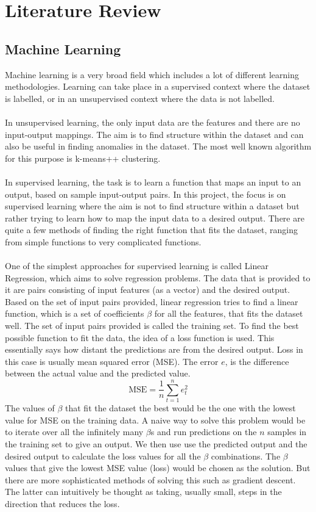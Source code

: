 \documentclass[12pt]{article}
\begin{document}
\section{Literature Review}
\subsection{Machine Learning}\label{subsec:ml}
Machine learning is a very broad field which includes a lot of different learning methodologies. Learning can take place in a supervised context where the dataset is labelled, or in an unsupervised context where the data is not labelled. 
\\\\
In unsupervised learning, the only input data are the features and there are no input-output mappings. The aim is to find structure within the dataset and can also be useful in finding anomalies in the dataset. The most well known algorithm for this purpose is k-means++ clustering.
\\\\
In supervised learning, the task is to learn a function that maps an input to an output, based on sample input-output pairs. In this project, the focus is on supervised learning where the aim is not to find structure within a dataset but rather trying to learn how to map the input data to a desired output. There are quite a few methods of finding the right function that fits the dataset, ranging from simple functions to very complicated functions.
\\\\
One of the simplest approaches for supervised learning is called Linear Regression, which aims to solve regression problems. The data that is provided to it are pairs consisting of input features (as a vector) and the desired output. Based on the set of input pairs provided, linear regression tries to find a linear function, which is a set of coefficients $\beta$ for all the features, that fits the dataset well. The set of input pairs provided is called the training set. To find the best possible function to fit the data, the idea of a loss function is used. This essentially says how distant the predictions are from the desired output. Loss in this case is usually mean squared error (MSE). The error $e$, is the difference between the actual value and the predicted value.
$$\mbox{MSE} = \frac{1}{n}\sum_{t=1}^{n}e_t^2$$
The values of $\beta$ that fit the dataset the best would be the one with the lowest value for MSE on the training data. A naive way to solve this problem would be to iterate over all the infinitely many $\beta$s and run predictions on the $n$ samples in the training set to give an output. We then use use the predicted output and the desired output to calculate the loss values for all the $\beta$ combinations. The $\beta$ values that give the lowest MSE value (loss) would be chosen as the solution. But there are more sophisticated methods of solving this such as gradient descent. The latter can intuitively be thought as taking, usually small, steps in the direction that reduces the loss. 
\end{document}
